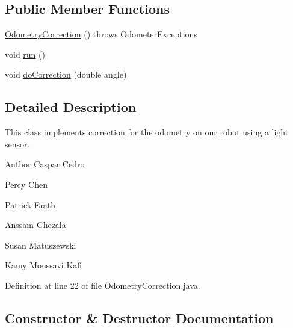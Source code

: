 \subsection*{Public Member Functions}
\begin{DoxyCompactItemize}
\item 
\hyperlink{classca_1_1mcgill_1_1ecse211_1_1odometer_1_1_odometry_correction_ad80b45e0bc4bf935494e075edcec739c}{Odometry\+Correction} ()  throws Odometer\+Exceptions 
\item 
void \hyperlink{classca_1_1mcgill_1_1ecse211_1_1odometer_1_1_odometry_correction_aad66a7030ac00f3a9cbe7bc33c25acbf}{run} ()
\item 
void \hyperlink{classca_1_1mcgill_1_1ecse211_1_1odometer_1_1_odometry_correction_a21a351682dc75060d6a5f15ad4775068}{do\+Correction} (double angle)
\end{DoxyCompactItemize}


\subsection{Detailed Description}
This class implements correction for the odometry on our robot using a light sensor.

\begin{DoxyAuthor}{Author}
Caspar Cedro 

Percy Chen 

Patrick Erath 

Anssam Ghezala 

Susan Matuszewski 

Kamy Moussavi Kafi 
\end{DoxyAuthor}


Definition at line 22 of file Odometry\+Correction.\+java.



\subsection{Constructor \& Destructor Documentation}
\mbox{\label{classca_1_1mcgill_1_1ecse211_1_1odometer_1_1_odometry_correction_ad80b45e0bc4bf935494e075edcec739c}} 
